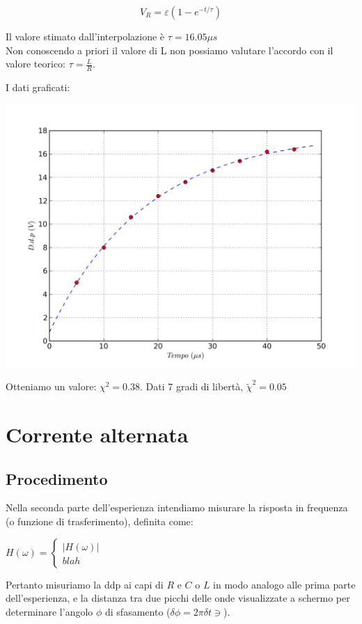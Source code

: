 $$V_R = \varepsilon \left( 1-e^{-t/\tau} \right)$$

Il valore stimato dall'interpolazione è $\tau=16.05 \mu s$ \\
Non conoscendo a priori il valore di L non possiamo valutare l'accordo con il valore teorico: $\tau=\frac{L}{R}$.

I dati graficati:
\begin{center}
 \includegraphics[scale=0.70]{grafici/C3/fitindu.png}
\end{center}

Otteniamo un valore: $\chi^2 = 0.38 $. Dati 7 gradi di libertà, $\tilde{\chi}^2 = 0.05$


\section{Corrente alternata}
\subsection{Procedimento}
Nella seconda parte dell'esperienza intendiamo misurare la risposta in frequenza (o funzione di trasferimento), definita come:

$H\left(\omega \right) = \begin{cases}
                          |H\left(\omega \right)| \\
                          blah
                         \end{cases}
$  

Pertanto misuriamo la ddp ai capi di $R$ e $C$ o $L$ in modo analogo alle prima parte dell'esperienza, e la distanza tra due picchi delle onde visualizzate a schermo per determinare l'angolo $\phi$ di sfasamento ($\delta \phi = 2 \pi \delta t \ni$).

